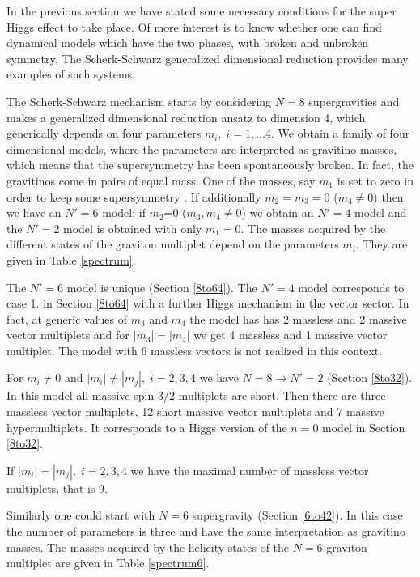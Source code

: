 \documentclass[a4paper,12pt]{article}
\begin{document}
In the previous section we have stated some necessary conditions
for the super  Higgs effect to take place. Of more interest is to
know whether one can find dynamical models which have the  two
phases, with  broken and  unbroken symmetry. The Scherk-Schwarz
generalized dimensional reduction \cite{ss,css} provides many
examples of such systems.

The Scherk-Schwarz mechanism starts by considering $N=8$
supergravities and makes a generalized  dimensional reduction
ansatz to dimension 4, which generically depends on four
parameters $m_i,\; i=1,\dots 4$. We obtain a family of four
dimensional models, where the parameters are interpreted as
gravitino masses, which means that the supersymmetry has been
spontaneously broken. In fact, the gravitinos come in pairs of
equal mass. One  of the masses, say $m_1$ is set  to zero in order
to keep some supersymmetry \cite{fz}. If additionally  $m_2=m_3=0$
($m_4\neq 0$) then we have an $N'=6$ model; if $m_2$=0
($m_3,m_4\neq 0$) we obtain an $N'=4$ model and the $N'=2$ model
is obtained with only $m_1=0$. The masses acquired by the
different states of the graviton multiplet depend on the
parameters $m_i$. They are given in Table \ref{spectrum}.











The $N'=6$ model is unique (Section \ref{8to64}). The $N'=4$ model
corresponds to case 1. in Section \ref{8to64} with a further Higgs
mechanism in the vector sector. In fact, at generic values of
$m_3$ and $m_4$ the model has has 2   massless and 2   massive
vector multiplets and for $|m_3|=|m_4|$ we get 4 massless and 1
massive vector multiplet. The model with 6 massless vectors is not
realized in this context.



For $m_i\neq 0$ and $|m_i|\neq|m_j|, \; i=2,3,4$ we have
$N=8\rightarrow N'=2$ (Section \ref{8to32}).  In this model all
massive  spin 3/2 multiplets  are short. Then there are three
massless vector multiplets, 12 short massive vector multiplets
and 7 massive hypermultiplets. It corresponds to a Higgs version
of the $n=0$ model in Section \ref{8to32}.

If $|m_i|=|m_j|, \; i=2,3,4$ we have the maximal number of
massless vector multiplets, that is 9.

\bigskip

Similarly one could start with $N=6$ supergravity  (Section
\ref{6to42}). In this case the number of  parameters is three and
have the same interpretation as gravitino masses. The masses
acquired by the helicity states of the $N=6$ graviton multiplet
are given in Table \ref{spectrum6}.
\end{document}
